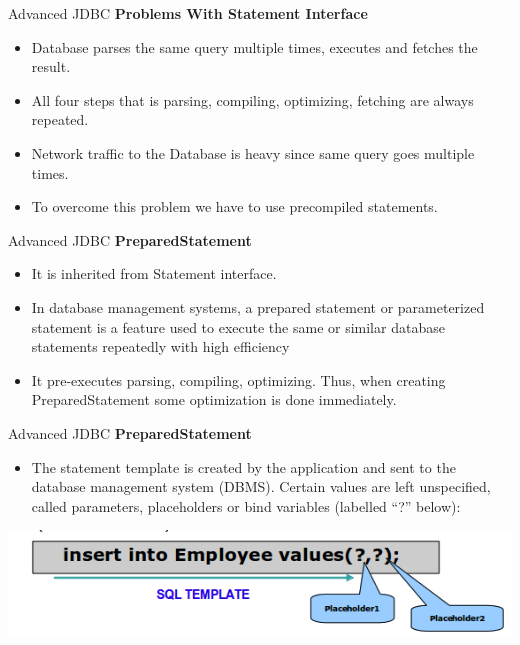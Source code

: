 \documentclass[14pt]{beamer}
\begin{document}
\begin{frame}{Advanced JDBC}
\textbf{Problems With Statement Interface}
\begin{itemize}
\item Database parses the same query multiple times, executes and fetches the result.
\item All four steps that is parsing, compiling, optimizing, fetching are always repeated.
\item Network traffic to the Database is heavy since same query goes multiple times.
\item To overcome this problem we have to use precompiled statements.
\end{itemize}
\end{frame}


\begin{frame}{Advanced JDBC}
\textbf{PreparedStatement}
\begin{itemize}
\item It is inherited from Statement interface.
\item In database management systems, a prepared statement or parameterized statement is a feature used to execute the same or similar database statements repeatedly with high efficiency
\item It pre-executes parsing, compiling, optimizing. Thus, when creating PreparedStatement some optimization is done immediately.
\end{itemize}
\end{frame}


\begin{frame}{Advanced JDBC}
\textbf{PreparedStatement}
\begin{itemize}
\item The statement template is created by the application and sent to the database management system (DBMS). Certain values are left unspecified, called parameters, placeholders or bind variables (labelled ``?'' below):

\end{itemize}
\begin{center}
    \includegraphics[scale=0.5]{JEE-M03-S02-Image2.png}
  \end{center}
\end{frame}
\end{document}
